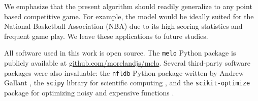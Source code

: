 \documentclass[aps,prc,reprint,amsmath,superscriptaddress]{revtex4-1}
\begin{document}
We emphasize that the present algorithm should readily generalize to any point based competitive game.
For example, the model would be ideally suited for the National Basketball Association (NBA) due to its high scoring statistics and frequent game play. 
We leave these applications to future studies.

\medskip

All software used in this work is open source.
The \texttt{melo} Python package is publicly available at \mbox{\url{github.com/morelandjs/melo}}.
Several third-party software packages were also invaluable: the \texttt{nfldb} Python package written by Andrew Gallant \cite{nfldb}, the \texttt{scipy} library for scientific computing \cite{scipy}, and the \texttt{scikit-optimize} package for optimizing noisy and expensive functions \cite{skopt}. 


\end{document}
